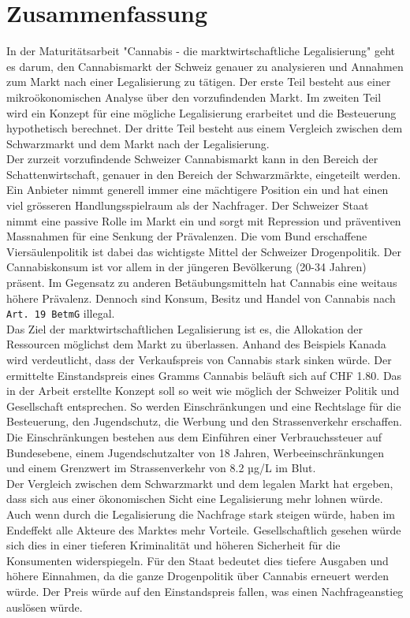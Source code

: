 \documentclass[../main.tex]{subfiles}
\begin{document}
	
	\section{Zusammenfassung}
	
	In der Maturitätsarbeit "Cannabis - die marktwirtschaftliche Legalisierung" geht es darum, den Cannabismarkt der Schweiz genauer zu analysieren und Annahmen zum Markt nach einer Legalisierung zu tätigen.
	Der erste Teil besteht aus einer mikroökonomischen Analyse über den vorzufindenden Markt.
	Im zweiten Teil wird ein Konzept für eine mögliche Legalisierung erarbeitet und die Besteuerung hypothetisch berechnet.
	Der dritte Teil besteht aus einem Vergleich zwischen dem Schwarzmarkt und dem Markt nach der Legalisierung.\\
	
	\noindent
	Der zurzeit vorzufindende Schweizer Cannabismarkt kann in den Bereich der Schattenwirtschaft, genauer in den Bereich der Schwarzmärkte, eingeteilt werden.
	Ein Anbieter nimmt generell immer eine mächtigere Position ein und hat einen viel grösseren Handlungsspielraum als der Nachfrager.
	Der Schweizer Staat nimmt eine passive Rolle im Markt ein und sorgt mit Repression und präventiven Massnahmen für eine Senkung der Prävalenzen.
	Die vom Bund erschaffene Viersäulenpolitik ist dabei das wichtigste Mittel der Schweizer Drogenpolitik.
	Der Cannabiskonsum ist vor allem in der jüngeren Bevölkerung (20-34 Jahren) präsent.
	Im Gegensatz zu anderen Betäubungsmitteln hat Cannabis eine weitaus höhere Prävalenz.
	Dennoch sind Konsum, Besitz und Handel von Cannabis nach \texttt{Art. 19 BetmG} illegal.\\
	
	\noindent
	Das Ziel der marktwirtschaftlichen Legalisierung ist es, die Allokation der Ressourcen möglichst dem Markt zu überlassen.
	Anhand des Beispiels Kanada wird verdeutlicht, dass der Verkaufspreis von Cannabis stark sinken würde.
	Der ermittelte Einstandspreis eines Gramms Cannabis beläuft sich auf CHF 1.80.
	Das in der Arbeit erstellte Konzept soll so weit wie möglich der Schweizer Politik und Gesellschaft entsprechen.
	So werden Einschränkungen und eine Rechtslage für die Besteuerung, den Jugendschutz, die Werbung und den Strassenverkehr erschaffen.
	Die Einschränkungen bestehen aus dem Einführen einer Verbrauchssteuer auf Bundesebene, einem Jugendschutzalter von 18 Jahren, Werbeeinschränkungen und einem Grenzwert im Strassenverkehr von 8.2 µg/L im Blut.\\
	
	\noindent	
	Der Vergleich zwischen dem Schwarzmarkt und dem legalen Markt hat ergeben, dass sich aus einer ökonomischen Sicht eine Legalisierung mehr lohnen würde.
	Auch wenn durch die Legalisierung die Nachfrage stark steigen würde, haben im Endeffekt alle Akteure des Marktes mehr Vorteile.
	Gesellschaftlich gesehen würde sich dies in einer tieferen Kriminalität und höheren Sicherheit für die Konsumenten widerspiegeln.
	Für den Staat bedeutet dies tiefere Ausgaben und höhere Einnahmen, da die ganze Drogenpolitik über Cannabis erneuert werden würde.
	Der Preis würde auf den Einstandspreis fallen, was einen Nachfrageanstieg auslösen würde.

	
	
\end{document}
